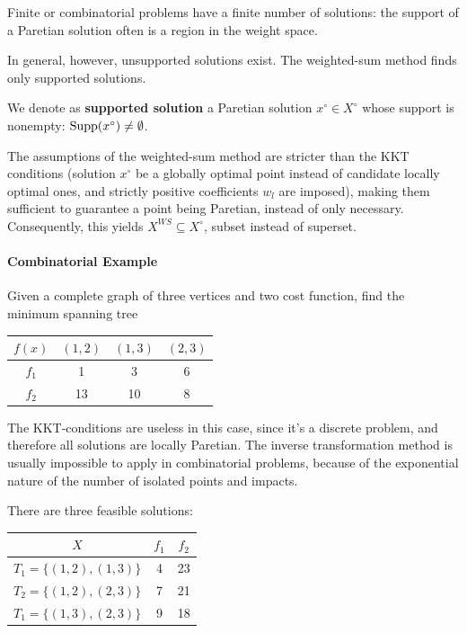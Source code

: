 Finite or combinatorial problems have a finite number of solutions: the support of a Paretian solution often is a region in the weight space. 

In general, however, unsupported solutions exist. The weighted-sum method finds only supported solutions. \\

\begin{definition}
	We denote as \textbf{supported solution} a Paretian solution $x^\circ \in X^\circ$ whose support is nonempty: $\operatorname{Supp} (x^\circ) \neq \emptyset$.
\end{definition}

The assumptions of the weighted-sum method are stricter than the KKT conditions (solution $x^\circ$ be a globally optimal point instead of candidate locally optimal ones, and strictly positive coefficients $w_l$ are imposed), making them sufficient to guarantee a point being Paretian, instead of only necessary. Consequently, this yields $X^{WS} \subseteq X^\circ$, subset instead of superset.

\paragraph{Combinatorial Example} Given a complete graph of three vertices and two cost function, find the minimum spanning tree
\begin{center}
	\begin{tabular}{c | c c c}
		$f(x)$ & $(1,2)$ & $(1,3)$ & $(2,3)$ \\
		\hline
		$f_1$ & 1 & 3 & 6 \\
		$f_2$ &13 & 10 & 8 
	\end{tabular}
\end{center}
The KKT-conditions are useless in this case, since it's a discrete problem, and therefore all solutions are locally Paretian. The inverse transformation method is usually impossible to apply in combinatorial problems, because of the exponential nature of the number of isolated points and impacts. 

There are three feasible solutions: 
\begin{center}
	\begin{tabular}{c | c c}
		$X$ & $f_1$ & $f_2$ \\
		\hline 
		$T_1 = \{(1,2), (1,3)\}$ & 4 & 23 \\
		$T_2 = \{(1,2), (2,3)\}$ & 7 & 21 \\
		$T_1 = \{(1,3), (2,3)\}$ & 9 & 18 \\
	\end{tabular}
\end{center}

